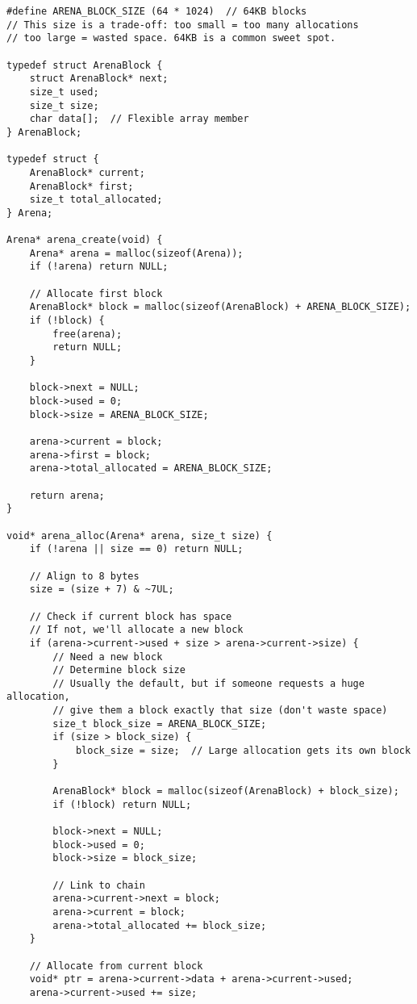 \begin{lstlisting}
#define ARENA_BLOCK_SIZE (64 * 1024)  // 64KB blocks
// This size is a trade-off: too small = too many allocations
// too large = wasted space. 64KB is a common sweet spot.

typedef struct ArenaBlock {
    struct ArenaBlock* next;
    size_t used;
    size_t size;
    char data[];  // Flexible array member
} ArenaBlock;

typedef struct {
    ArenaBlock* current;
    ArenaBlock* first;
    size_t total_allocated;
} Arena;

Arena* arena_create(void) {
    Arena* arena = malloc(sizeof(Arena));
    if (!arena) return NULL;

    // Allocate first block
    ArenaBlock* block = malloc(sizeof(ArenaBlock) + ARENA_BLOCK_SIZE);
    if (!block) {
        free(arena);
        return NULL;
    }

    block->next = NULL;
    block->used = 0;
    block->size = ARENA_BLOCK_SIZE;

    arena->current = block;
    arena->first = block;
    arena->total_allocated = ARENA_BLOCK_SIZE;

    return arena;
}

void* arena_alloc(Arena* arena, size_t size) {
    if (!arena || size == 0) return NULL;

    // Align to 8 bytes
    size = (size + 7) & ~7UL;

    // Check if current block has space
    // If not, we'll allocate a new block
    if (arena->current->used + size > arena->current->size) {
        // Need a new block
        // Determine block size
        // Usually the default, but if someone requests a huge allocation,
        // give them a block exactly that size (don't waste space)
        size_t block_size = ARENA_BLOCK_SIZE;
        if (size > block_size) {
            block_size = size;  // Large allocation gets its own block
        }

        ArenaBlock* block = malloc(sizeof(ArenaBlock) + block_size);
        if (!block) return NULL;

        block->next = NULL;
        block->used = 0;
        block->size = block_size;

        // Link to chain
        arena->current->next = block;
        arena->current = block;
        arena->total_allocated += block_size;
    }

    // Allocate from current block
    void* ptr = arena->current->data + arena->current->used;
    arena->current->used += size;


\end{lstlisting}
